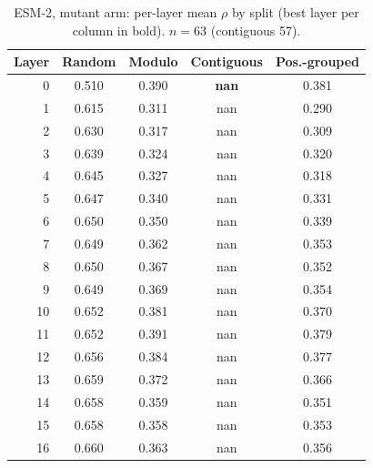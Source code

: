 \documentclass[11pt,a4paper]{article}
\begin{document}
\begin{table}[H]\centering\small

\caption{ESM-2, mutant arm: per-layer mean $\rho$ by split (best layer per column in bold). $n=63$ (contiguous 57).}

\label{tab:S2ESM-2mutant}

\begin{tabular}{rcccc}

\toprule

Layer & Random & Modulo & Contiguous & Pos.-grouped \\

\midrule

0 & 0.510 & 0.390 & \textbf{nan} & 0.381 \\

1 & 0.615 & 0.311 & nan & 0.290 \\

2 & 0.630 & 0.317 & nan & 0.309 \\

3 & 0.639 & 0.324 & nan & 0.320 \\

4 & 0.645 & 0.327 & nan & 0.318 \\

5 & 0.647 & 0.340 & nan & 0.331 \\

6 & 0.650 & 0.350 & nan & 0.339 \\

7 & 0.649 & 0.362 & nan & 0.353 \\

8 & 0.650 & 0.367 & nan & 0.352 \\

9 & 0.649 & 0.369 & nan & 0.354 \\

10 & 0.652 & 0.381 & nan & 0.370 \\

11 & 0.652 & 0.391 & nan & 0.379 \\

12 & 0.656 & 0.384 & nan & 0.377 \\

13 & 0.659 & 0.372 & nan & 0.366 \\

14 & 0.658 & 0.359 & nan & 0.351 \\

15 & 0.658 & 0.358 & nan & 0.353 \\

16 & 0.660 & 0.363 & nan & 0.356 \\


\end{tabular}
\end{table}
\end{document}
